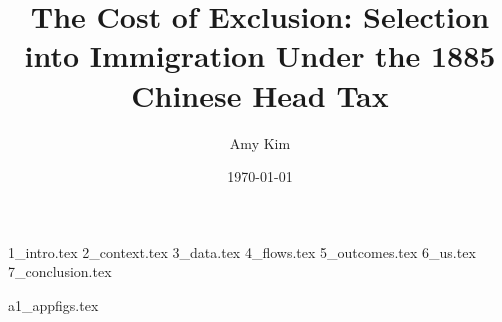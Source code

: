 \documentclass[12pt]{article}
\title{The Cost of Exclusion: Selection into Immigration Under the 1885 Chinese Head Tax}
\author{Amy Kim}
\date{\today}
\begin{document}
\maketitle


{1_intro.tex}
{2_context.tex}
{3_data.tex}
{4_flows.tex}
{5_outcomes.tex}
{6_us.tex}
{7_conclusion.tex}

\newpage


\newpage
\appendix 
{a1_appfigs.tex}
\end{document}
